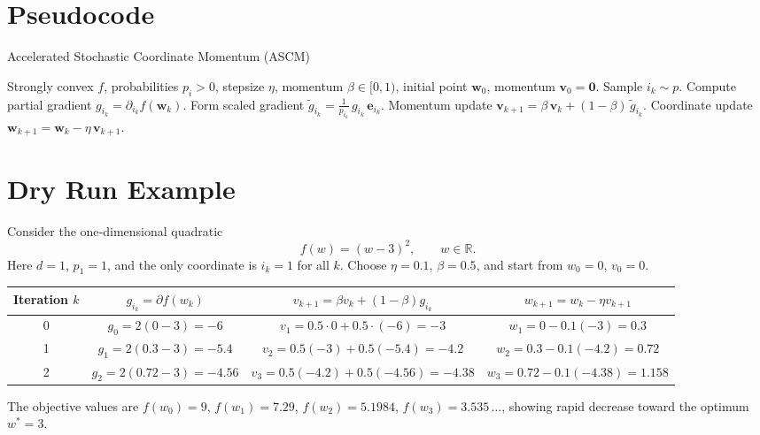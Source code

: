 \documentclass{article}
\newcommand{\R}{\mathbb{R}}
\begin{document}
\section*{Pseudocode}
\begin{algorithm}[H]
\caption{Accelerated Stochastic Coordinate Momentum (ASCM)}\label{alg:ascm}
\begin{algorithmic}[1]
\Require Strongly convex $f$, probabilities $p_i>0$, stepsize $\eta$, momentum $\beta\in[0,1)$,
initial point $\mathbf w_0$, momentum $\mathbf v_0=\mathbf 0$.
    \State Sample $i_k\sim p$.
    \State Compute partial gradient $g_{i_k}= \partial_{i_k}f(\mathbf w_k)$.
    \State Form scaled gradient
    $\displaystyle \tilde g_{i_k}= \frac{1}{p_{i_k}}\,g_{i_k}\,\mathbf e_{i_k}$.
    \State Momentum update
    $\displaystyle \mathbf v_{k+1}= \beta\,\mathbf v_k+(1-\beta)\,\tilde g_{i_k}$.
    \State Coordinate update
    $\displaystyle \mathbf w_{k+1}= \mathbf w_k-\eta\,\mathbf v_{k+1}$.
\EndFor
\end{algorithmic}
\end{algorithm}

\section*{Dry Run Example}
Consider the one‑dimensional quadratic
\[
f(w)=(w-3)^2,\qquad w\in\R .
\]
Here $d=1$, $p_1=1$, and the only coordinate is $i_k=1$ for all $k$.
Choose $\eta=0.1$, $\beta=0.5$, and start from $w_0=0$, $v_0=0$.

\begin{center}
\begin{tabular}{c|c|c|c}
Iteration $k$ & $g_{i_k}= \partial f(w_k)$ & $v_{k+1}= \beta v_k+(1-\beta)g_{i_k}$ & $w_{k+1}= w_k-\eta v_{k+1}$\\ \hline
0 & $g_0=2(0-3)=-6$ & $v_1=0.5\cdot0+0.5\cdot(-6)=-3$ & $w_1=0-0.1(-3)=0.3$\\[4pt]
1 & $g_1=2(0.3-3)=-5.4$ & $v_2=0.5(-3)+0.5(-5.4)=-4.2$ & $w_2=0.3-0.1(-4.2)=0.72$\\[4pt]
2 & $g_2=2(0.72-3)=-4.56$ & $v_3=0.5(-4.2)+0.5(-4.56)=-4.38$ & $w_3=0.72-0.1(-4.38)=1.158$\\
\end{tabular}
\end{center}
The objective values are $f(w_0)=9$, $f(w_1)=7.29$, $f(w_2)=5.1984$, $f(w_3)=3.535\,\dots$, showing rapid decrease toward the optimum $w^*=3$.
\end{document}
